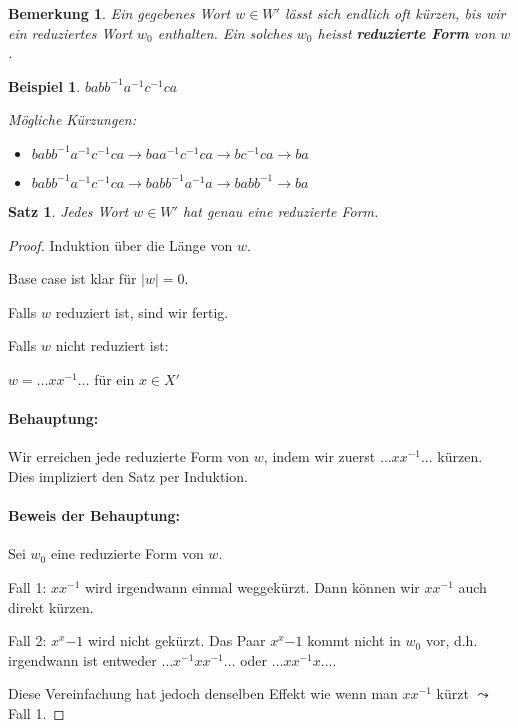 \documentclass{article}
\theoremstyle{plain}
\newtheorem{theorem}{Satz}
\newtheorem{beispiel}{Beispiel}
\newtheorem{bemerkung}{Bemerkung}
\newcommand{\defn}[1]{\textbf{#1}}
\begin{document}
\begin{bemerkung}
    Ein gegebenes Wort $w\in W'$ lässt sich endlich oft kürzen, bis wir ein reduziertes Wort $w_0$ enthalten. Ein solches $w_0$ heisst \defn{reduzierte Form} von $w$.
\end{bemerkung}
\begin{beispiel}
    $babb^{-1}a^{-1}c^{-1}ca$

    Mögliche Kürzungen:
    \begin{itemize}
        \item $babb^{-1}a^{-1}c^{-1}ca\to baa^{-1}c^{-1}ca \to bc^{-1}ca\to ba$
        \item $babb^{-1}a^{-1}c^{-1}ca\to babb^{-1}a^{-1}a \to babb^{-1}\to ba$
    \end{itemize}
\end{beispiel}
\begin{theorem}
    Jedes Wort $w\in W'$ hat genau eine reduzierte Form.
\end{theorem}
\begin{proof}
    Induktion über die Länge von $w$.
    
    Base case ist klar für $|w|=0$.
    
    Falls $w$ reduziert ist, sind wir fertig.
    
    Falls $w$ nicht reduziert ist:
    
    $w=\ldots xx^{-1} \ldots$ für ein $x\in X'$

    \paragraph{Behauptung:} Wir erreichen jede reduzierte Form von $w$, indem wir zuerst $\ldots xx^{-1}\ldots$ kürzen.
    Dies impliziert den Satz per Induktion.
    \paragraph{Beweis der Behauptung:} Sei $w_0$ eine reduzierte Form von $w$.
    
    Fall 1: $xx^{-1}$ wird irgendwann einmal weggekürzt. Dann können wir $xx^{-1}$ auch direkt kürzen.

    Fall 2: $x^x{-1}$ wird nicht gekürzt. Das Paar $x^x{-1}$ kommt nicht in $w_0$ vor, d.h. irgendwann ist entweder $\ldots x^{-1}xx^{-1}\ldots$ oder $\ldots xx^{-1}x\ldots$.

    Diese Vereinfachung hat jedoch denselben Effekt wie wenn man $xx^{-1}$ kürzt $\leadsto$ Fall 1.
\end{proof}
\end{document}
